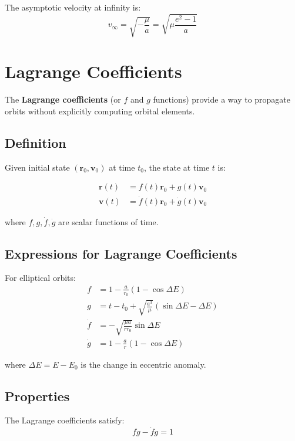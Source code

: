 The asymptotic velocity at infinity is:
\begin{equation}
    v_\infty = \sqrt{-\frac{\mu}{a}} = \sqrt{\mu\frac{e^2-1}{a}}
\end{equation}

\section{Lagrange Coefficients}

The \textbf{Lagrange coefficients} (or $f$ and $g$ functions) provide a way to propagate orbits without explicitly computing orbital elements.

\subsection{Definition}

Given initial state $(\mathbf{r}_0, \mathbf{v}_0)$ at time $t_0$, the state at time $t$ is:

\begin{align}
    \mathbf{r}(t) &= f(t)\mathbf{r}_0 + g(t)\mathbf{v}_0 \\
    \mathbf{v}(t) &= \dot{f}(t)\mathbf{r}_0 + \dot{g}(t)\mathbf{v}_0
\end{align}

where $f, g, \dot{f}, \dot{g}$ are scalar functions of time.

\subsection{Expressions for Lagrange Coefficients}

For elliptical orbits:
\begin{align}
    f &= 1 - \frac{a}{r_0}(1 - \cos\Delta E) \\
    g &= t - t_0 + \sqrt{\frac{a^3}{\mu}}(\sin\Delta E - \Delta E) \\
    \dot{f} &= -\sqrt{\frac{\mu a}{rr_0}}\sin\Delta E \\
    \dot{g} &= 1 - \frac{a}{r}(1 - \cos\Delta E)
\end{align}

where $\Delta E = E - E_0$ is the change in eccentric anomaly.

\subsection{Properties}

The Lagrange coefficients satisfy:
\begin{equation}
    f\dot{g} - \dot{f}g = 1
\end{equation}


